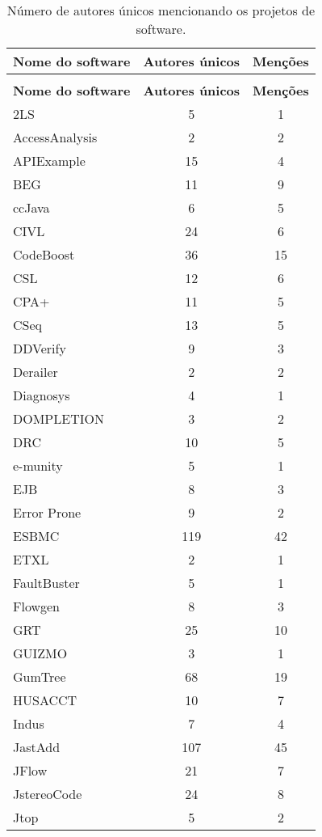 
\begin{longtable}{ l c c }
\caption{Número de autores únicos mencionando os projetos de software.}
\label{authorship-table} \\
  \hline
  \hhline{ l c c |}
  \endfirsthead
  \hhline{ l c c |}
  \hline
  \textbf{Nome do software} & {\bf Autores únicos} & {\bf Menções} \\
  \hline
  \hhline{ l c c |}
  \endhead
  \hhline{---}
  \multicolumn{3}{c}{continua na próxima página} \\
  \hhline{---} \endfoot
  \hhline{---} \endlastfoot
  \textbf{Nome do software} & {\bf Autores únicos} & {\bf Menções} \\
  \hline
   2LS & 5 & 1 \\
   AccessAnalysis & 2 & 2 \\
   APIExample & 15 & 4 \\
   BEG & 11 & 9 \\
   ccJava & 6 & 5 \\
   CIVL & 24 & 6 \\
   CodeBoost & 36 & 15 \\
   CSL & 12 & 6 \\
   CPA+ & 11 & 5 \\
   CSeq & 13 & 5 \\
   DDVerify & 9 & 3 \\
   Derailer & 2 & 2 \\
   Diagnosys & 4 & 1 \\
   DOMPLETION & 3 & 2 \\
   DRC & 10 & 5 \\
   e-munity & 5 & 1 \\
   EJB & 8 & 3 \\
   Error Prone & 9 & 2 \\
   ESBMC & 119 & 42 \\
   ETXL & 2 & 1 \\
   FaultBuster & 5 & 1 \\
   Flowgen & 8 & 3 \\
   GRT & 25 & 10 \\
   GUIZMO & 3 & 1 \\
   GumTree & 68 & 19 \\
   HUSACCT & 10 & 7 \\
   Indus & 7 & 4 \\
   JastAdd & 107 & 45 \\
   JFlow & 21 & 7 \\
   JstereoCode & 24 & 8 \\
   Jtop & 5 & 2 \\

\end{longtable}
